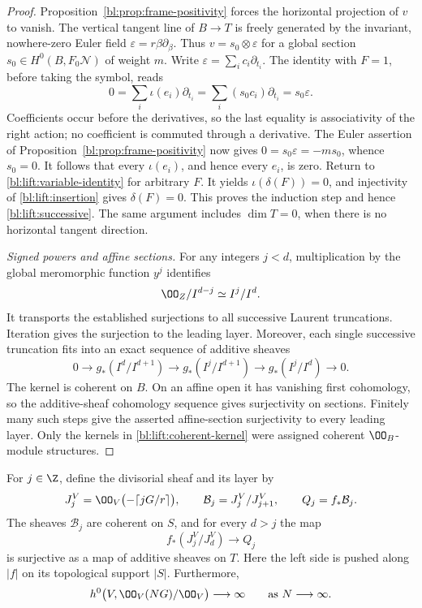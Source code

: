 \begin{proof}
Proposition~\ref{bl:prop:frame-positivity} forces the horizontal projection
of \(v\) to vanish.  The vertical tangent line of \(B\to T\) is
freely generated by the invariant, nowhere-zero Euler field
\(\varepsilon=r\beta\partial_\beta\).  Thus
\(v=s_0\otimes\varepsilon\) for a global section
\(s_0\in H^0(B,F_0\mathcal N)\) of weight \(m\).
Write \(\varepsilon=\sum_i c_i\partial_{t_i}\).  The identity with
\(F=1\), before taking the symbol, reads
\[
 0=\sum_i\iota(e_i)\partial_{t_i}
   =\sum_i(s_0c_i)\partial_{t_i}=s_0\varepsilon.
\]
Coefficients occur before the derivatives, so the last equality is
associativity of the right action; no coefficient is commuted through a
derivative.  The Euler assertion of
Proposition~\ref{bl:prop:frame-positivity} now gives
\(0=s_0\varepsilon=-ms_0\), whence \(s_0=0\).
It follows that every \(\iota(e_i)\), and hence every \(e_i\), is
zero.  Return to \eqref{bl:lift:variable-identity} for arbitrary \(F\).
It yields \(\iota(\delta(F))=0\), and injectivity of
\eqref{bl:lift:insertion} gives \(\delta(F)=0\).  This proves the
induction step and hence \eqref{bl:lift:successive}.  The same argument
includes \(\dim T=0\), when there is no horizontal tangent direction.

\smallskip\noindent
\emph{Signed powers and affine sections.}
For any integers \(j<d\), multiplication by the global meromorphic
function \(y^j\) identifies
\[
 \OO_Z/I^{d-j}\simeq I^j/I^d.
\]
It transports the established surjections to all successive Laurent
truncations.  Iteration gives the surjection to the leading layer.
Moreover, each single successive truncation fits into an exact sequence
of additive sheaves
\begin{equation}\label{bl:lift:coherent-kernel}
 0\longrightarrow g_*(I^d/I^{d+1})
 \longrightarrow g_*(I^j/I^{d+1})
 \longrightarrow g_*(I^j/I^d)\longrightarrow0.
\end{equation}
The kernel is coherent on \(B\).  On an affine open it has vanishing
first cohomology, so the additive-sheaf cohomology sequence gives
surjectivity on sections.  Finitely many such steps give the asserted
affine-section surjectivity to every leading layer.  Only the kernels
in \eqref{bl:lift:coherent-kernel} were assigned coherent \(\OO_B\)-module
structures.
\end{proof}

\begin{lemma}\label{bl:lem:descent-growth}
For \(j\in\Z\), define the divisorial sheaf and its layer by
\[
 J_j^V=\OO_V\bigl(-\lceil jG/r\rceil\bigr),
 \qquad \mathcal B_j=J_j^V/J_{j+1}^V,
 \qquad Q_j=f_*\mathcal B_j.
\]
The sheaves \(\mathcal B_j\) are coherent on \(S\), and for every
\(d>j\) the map
\begin{equation}\label{bl:lift:descent-surjection}
 f_*(J_j^V/J_d^V)\longrightarrow Q_j
\end{equation}
is surjective as a map of additive sheaves on \(T\).  Here the left
side is pushed along \(|f|\) on its topological support \(|S|\).
Furthermore,
\[
 h^0\bigl(V,\OO_V(NG)/\OO_V\bigr)\longrightarrow\infty
 \qquad\text{as }N\longrightarrow\infty.
\]
\end{lemma}


